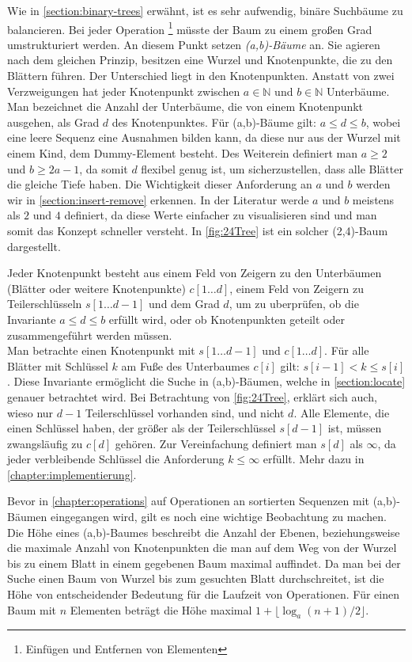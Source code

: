 Wie in \autoref{section:binary-trees} erwähnt, ist es sehr aufwendig, binäre Suchbäume zu balancieren. Bei jeder Operation \footnote{Einfügen und Entfernen von Elementen} müsste der Baum zu einem großen Grad umstrukturiert werden. An diesem Punkt setzen \textit{(a,b)-Bäume} an. Sie agieren nach dem gleichen Prinzip, besitzen eine Wurzel und Knotenpunkte, die zu den Blättern führen. Der Unterschied liegt in den Knotenpunkten. Anstatt von zwei Verzweigungen hat jeder Knotenpunkt zwischen $a \in \mathds{N}$ und $b \in \mathds{N}$ Unterbäume. Man bezeichnet die Anzahl der Unterbäume, die von einem Knotenpunkt ausgehen, als Grad $d$ des Knotenpunktes. Für (a,b)-Bäume gilt: $a \leq d \leq b$, wobei eine leere Sequenz eine Ausnahmen bilden kann, da diese nur aus der Wurzel mit einem Kind, dem Dummy-Element besteht.  Des Weiterein definiert man $a \geq 2$ und $b \geq 2 a - 1$, da somit $d$ flexibel genug ist, um sicherzustellen, dass alle Blätter die gleiche Tiefe haben. Die Wichtigkeit dieser Anforderung an $a$ und $b$ werden wir in \autoref{section:insert-remove} erkennen. In der Literatur \cite{Sanders:19} werde $a$ und $b$ meistens als $2$ und $4$ definiert, da diese Werte einfacher zu visualisieren sind und man somit das Konzept schneller versteht. In \autoref{fig:24Tree} ist ein solcher (2,4)-Baum dargestellt.
\par
Jeder Knotenpunkt besteht aus einem Feld von Zeigern zu den Unterbäumen (Blätter oder weitere Knotenpunkte) $c[1\dots d]$, einem Feld von Zeigern zu Teilerschlüsseln $s[1 \dots d-1]$ und dem Grad $d$, um zu uberprüfen, ob die Invariante $a \leq d \leq b$ erfüllt wird, oder ob Knotenpunkten geteilt oder zusammengeführt werden müssen.
\\
Man betrachte einen Knotenpunkt mit $s[1 \dots d-1]$ und $c[1 \dots d]$. Für alle Blätter mit Schlüssel $k$ am Fuße des Unterbaumes $c[i]$ gilt: $s[i-1] < k \leq s[i]$. Diese Invariante ermöglicht die Suche in (a,b)-Bäumen, welche in \autoref{section:locate} genauer betrachtet wird. Bei Betrachtung von \autoref{fig:24Tree}, erklärt sich auch, wieso nur $d-1$ Teilerschlüssel vorhanden sind, und nicht $d$. Alle Elemente, die einen Schlüssel haben, der größer als der Teilerschlüssel $s[d-1]$ ist, müssen zwangsläufig zu $c[d]$ gehören. Zur Vereinfachung definiert man $s[d]$ als $\infty$, da jeder verbleibende Schlüssel die Anforderung $k \leq \infty$ erfüllt. Mehr dazu in \autoref{chapter:implementierung}.
\par
Bevor in \autoref{chapter:operations} auf Operationen an sortierten Sequenzen mit (a,b)-Bäumen eingegangen wird, gilt es noch eine wichtige Beobachtung zu machen. Die Höhe eines (a,b)-Baumes beschreibt die Anzahl der Ebenen, beziehungsweise die maximale Anzahl von Knotenpunkten die man auf dem Weg von der Wurzel bis zu einem Blatt in einem gegebenen Baum maximal auffindet. Da man bei der Suche einen Baum von Wurzel bis zum gesuchten Blatt durchschreitet, ist die Höhe von entscheidender Bedeutung für die Laufzeit von Operationen. Für einen Baum mit $n$ Elementen beträgt die Höhe maximal $1+ \lfloor \log_{a}(n+1)/2 \rfloor$. \cite{Sanders:19}
